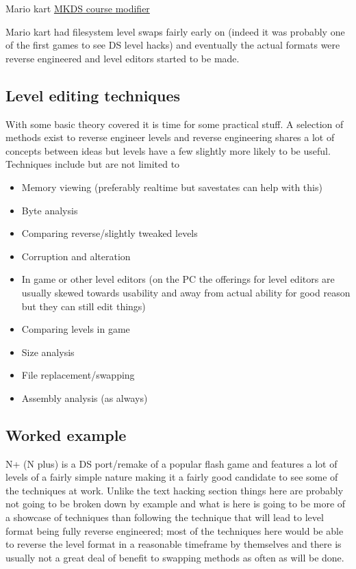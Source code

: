 \documentclass[
]{book}
\providecommand{\tightlist}{%
  \setlength{\itemsep}{0pt}\setlength{\parskip}{0pt}}
\begin{document}
Mario kart \href{http://gbatemp.net/topic/299444-mkds-course-modifier/}{MKDS course modifier}

Mario kart had filesystem level swaps fairly early on (indeed it was probably one of the first games to see DS level hacks) and eventually the actual formats were reverse engineered and level editors started to be made.

\hypertarget{level-editing-techniques}{%
\subsection{Level editing techniques}\label{level-editing-techniques}}

With some basic theory covered it is time for some practical stuff. A selection of methods exist to reverse engineer levels and reverse engineering shares a lot of concepts between ideas but levels have a few slightly more likely to be useful. Techniques include but are not limited to

\begin{itemize}
\tightlist
\item
  Memory viewing (preferably realtime but savestates can help with this)
\item
  Byte analysis
\item
  Comparing reverse/slightly tweaked levels
\item
  Corruption and alteration
\item
  In game or other level editors (on the PC the offerings for level editors are usually skewed towards usability and away from actual ability for good reason but they can still edit things)
\item
  Comparing levels in game
\item
  Size analysis
\item
  File replacement/swapping
\item
  Assembly analysis (as always)
\end{itemize}

\hypertarget{worked-example-1}{%
\subsection{Worked example}\label{worked-example-1}}

N+ (N plus) is a DS port/remake of a popular flash game and features a lot of levels of a fairly simple nature making it a fairly good candidate to see some of the techniques at work. Unlike the text hacking section things here are probably not going to be broken down by example and what is here is going to be more of a showcase of techniques than following the technique that will lead to level format being fully reverse engineered; most of the techniques here would be able to reverse the level format in a reasonable timeframe by themselves and there is usually not a great deal of benefit to swapping methods as often as will be done.
\end{document}
